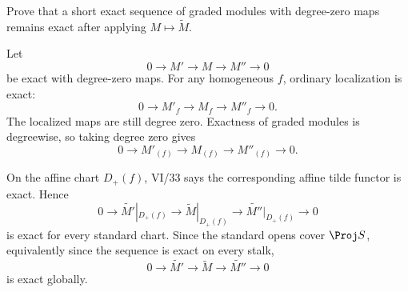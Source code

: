 \begin{problem}\label{prob:vi35-06}
Prove that a short exact sequence of graded modules with degree-zero maps remains exact after applying \(M\mapsto\widetilde M\).
\end{problem}

\ifdefined\FullProblemDossiers
\begin{solution}
Let
\[
0\to M'\to M\to M''\to0
\]
be exact with degree-zero maps. For any homogeneous \(f\), ordinary localization is exact:
\[
0\to M'_f\to M_f\to M''_f\to0.
\]
The localized maps are still degree zero. Exactness of graded modules is degreewise, so taking degree zero gives
\[
0\to M'_{(f)}\to M_{(f)}\to M''_{(f)}\to0.
\]

On the affine chart \(D_+(f)\), VI/33 says the corresponding affine tilde functor is exact. Hence
\[
0\to\widetilde{M'}|_{D_+(f)}
\to\widetilde M|_{D_+(f)}
\to\widetilde{M''}|_{D_+(f)}
\to0
\]
is exact for every standard chart. Since the standard opens cover \(\Proj S\), equivalently since the sequence is
exact on every stalk,
\[
\boxed{
0\to\widetilde{M'}\to\widetilde M\to\widetilde{M''}\to0
}
\]
is exact globally.
\end{solution}
\fi
